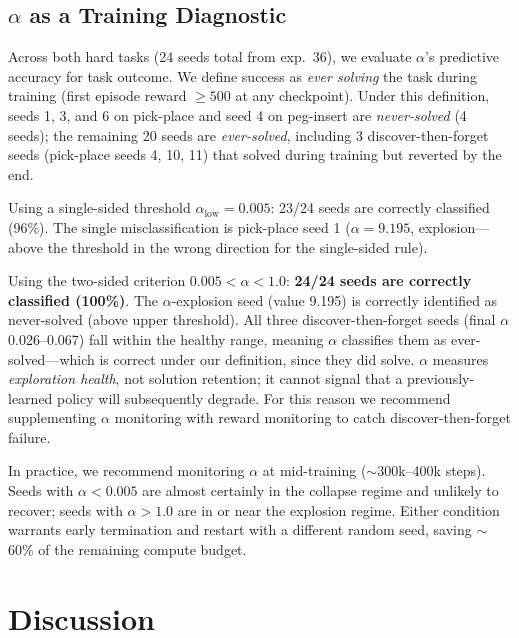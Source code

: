 \documentclass[twocolumn]{article}
\begin{document}
\subsection{$\alpha$ as a Training Diagnostic}
\label{sec:diagnostic}

Across both hard tasks (24 seeds total from exp.~36), we evaluate $\alpha$'s
predictive accuracy for task outcome. We define success as \emph{ever solving}
the task during training (first episode reward $\geq 500$ at any checkpoint).
Under this definition, seeds 1, 3, and 6 on pick-place and seed 4 on peg-insert
are \emph{never-solved} (4 seeds); the remaining 20 seeds are \emph{ever-solved},
including 3 discover-then-forget seeds (pick-place seeds 4, 10, 11) that solved
during training but reverted by the end.

Using a single-sided threshold $\alpha_{\text{low}} = 0.005$: 23/24 seeds are
correctly classified (96\%). The single misclassification is pick-place seed 1
($\alpha = 9.195$, explosion---above the threshold in the wrong direction for
the single-sided rule).

Using the two-sided criterion $0.005 < \alpha < 1.0$: \textbf{24/24 seeds are
correctly classified (100\%)}. The $\alpha$-explosion seed (value 9.195) is
correctly identified as never-solved (above upper threshold). All three
discover-then-forget seeds (final $\alpha$ 0.026--0.067) fall within the
healthy range, meaning $\alpha$ classifies them as ever-solved---which is
correct under our definition, since they did solve. $\alpha$ measures
\emph{exploration health}, not solution retention; it cannot signal that a
previously-learned policy will subsequently degrade. For this reason we
recommend supplementing $\alpha$ monitoring with reward monitoring to
catch discover-then-forget failure.

In practice, we recommend monitoring $\alpha$ at mid-training ($\sim$300k--400k
steps). Seeds with $\alpha < 0.005$ are almost certainly in the collapse regime
and unlikely to recover; seeds with $\alpha > 1.0$ are in or near the explosion
regime. Either condition warrants early termination and restart with a different
random seed, saving $\sim$60\% of the remaining compute budget.


\section{Discussion}
\label{sec:discussion}
\end{document}
